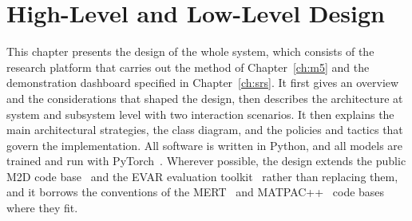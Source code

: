 \documentclass{FastFyp}
\begin{document}
\chapter{High-Level and Low-Level Design}
\label{ch:design}
\newcommand{\desclass}[3]{\begin{tabular}{@{\,}p{4.3cm}@{\,}}\textbf{#1}\\ \hline #2\\ \hline #3\end{tabular}}
\newcommand{\desframe}[5]{%
  \draw[black!70] (#1,#2) rectangle (#3,#4);
  \node[draw=black!70, fill=white, anchor=north west, font=\footnotesize, inner sep=2pt] at (#1,#2) {#5};}

This chapter presents the design of the whole system, which consists of the research platform that carries out the method of Chapter~\ref{ch:m5} and the demonstration dashboard specified in Chapter~\ref{ch:srs}. It first gives an overview and the considerations that shaped the design, then describes the architecture at system and subsystem level with two interaction scenarios. It then explains the main architectural strategies, the class diagram, and the policies and tactics that govern the implementation. All software is written in Python, and all models are trained and run with PyTorch~\cite{ref:Paszke:2019pytorch}. Wherever possible, the design extends the public M2D code base~\cite{ref:M2DGit} and the EVAR evaluation toolkit~\cite{ref:EVARGit} rather than replacing them, and it borrows the conventions of the MERT~\cite{ref:MERTGit} and MATPAC++~\cite{ref:MATPACGit} code bases where they fit.
\end{document}
